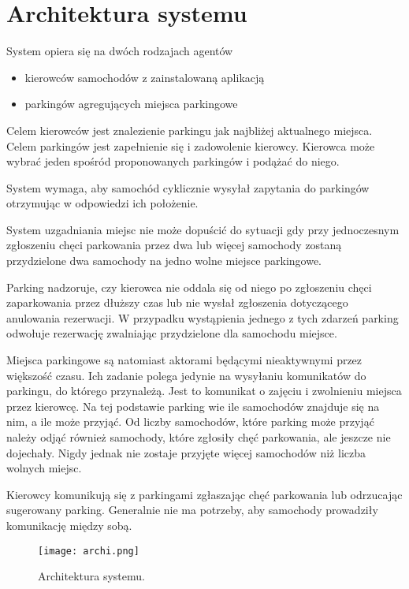 \newpage
\section{Architektura systemu}

System opiera się na dwóch rodzajach agentów
\begin{itemize}
\item kierowców samochodów z zainstalowaną aplikacją
\item parkingów agregujących miejsca parkingowe
\end{itemize}

Celem kierowców jest znalezienie parkingu jak najbliżej aktualnego miejsca.
Celem parkingów jest zapełnienie się i zadowolenie kierowcy. {\color{teal} Kierowca może wybrać jeden spośród proponowanych parkingów i podążać do niego.}

{\color{teal} System wymaga, aby samochód cyklicznie wysyłał zapytania do parkingów otrzymując w odpowiedzi ich położenie. }

System uzgadniania miejsc nie może dopuścić do sytuacji gdy przy jednoczesnym zgłoszeniu chęci parkowania przez dwa lub więcej samochody zostaną przydzielone dwa samochody na jedno wolne miejsce parkingowe.

{\color{teal} Parking nadzoruje, czy kierowca nie oddala się od niego po zgłoszeniu chęci zaparkowania przez dłuższy czas lub nie wysłał zgłoszenia dotyczącego anulowania rezerwacji. W przypadku wystąpienia jednego z tych zdarzeń parking odwołuje rezerwację zwalniając przydzielone dla samochodu miejsce.}

Miejsca parkingowe są natomiast aktorami będącymi nieaktywnymi przez większość czasu. Ich zadanie polega jedynie na wysyłaniu komunikatów do parkingu, do którego przynależą. Jest to komunikat o zajęciu i zwolnieniu miejsca przez kierowcę. Na tej podstawie parking wie ile samochodów znajduje się na nim, a ile może przyjąć. Od liczby samochodów, które parking może przyjąć należy odjąć również samochody, które zgłosiły chęć parkowania, ale jeszcze nie dojechały. Nigdy jednak nie zostaje przyjęte więcej samochodów niż liczba wolnych miejsc.

Kierowcy komunikują się z parkingami zgłaszając chęć parkowania lub odrzucając sugerowany parking. Generalnie nie ma potrzeby, aby samochody prowadziły komunikację między sobą.


\begin{figure}[H]
    \label{fig:architektura}
    \centering \texttt{[image: archi.png]}
    \caption{Architektura systemu.}
\end{figure}